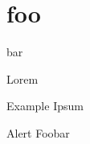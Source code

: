 \documentclass{beamer}
\begin{document}
\section{foo}
\begin{frame}{bar}
    \begin{theorem}[bla]
        Lorem
    \end{theorem}
    \begin{exampleblock}{Example}
        Ipsum
    \end{exampleblock}
    \begin{alertblock}{Alert}
        Foobar
    \end{alertblock}
\end{frame}
\end{document}
